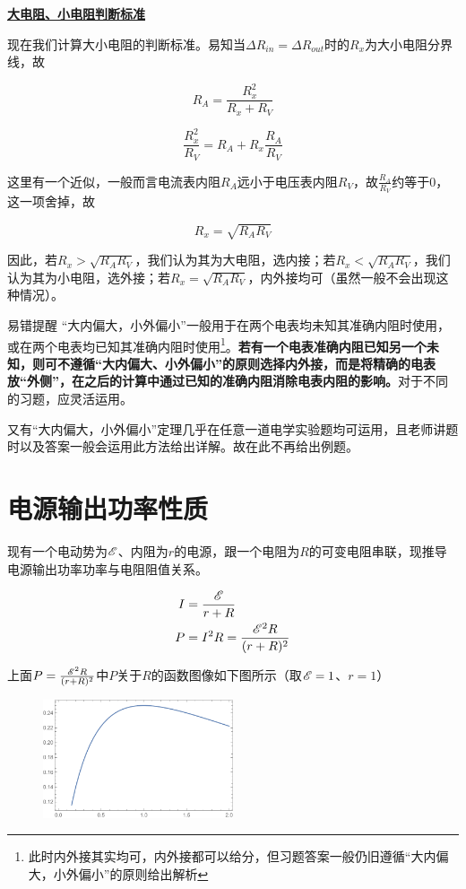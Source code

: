 \noindent \uline{\textbf{大电阻、小电阻判断标准}}

现在我们计算大小电阻的判断标准。易知当$\Delta R_{in} = \Delta R_{out}$时的$R_x$为大小电阻分界线，故

$$R_A = \frac{R_x^2}{R_x + R_V}$$

$$\frac{R_x^2}{R_V} = R_A + R_x \frac{R_A}{R_V}$$

这里有一个近似，一般而言电流表内阻$R_A$远小于电压表内阻$R_V$，故$\frac{R_A}{R_V}$约等于$0$，这一项舍掉，故

\begin{equation}
\boxed{R_x = \sqrt{R_A R_V}}
\end{equation}

因此，若$R_x > \sqrt{R_A R_V}$，我们认为其为大电阻，选内接；若$R_x < \sqrt{R_A R_V}$，我们认为其为小电阻，选外接；若$R_x = \sqrt{R_A R_V}$，内外接均可（虽然一般不会出现这种情况）。

\begin{mk}{易错提醒}{}
“大内偏大，小外偏小”一般用于在两个电表均未知其准确内阻时使用，或在两个电表均已知其准确内阻时使用\footnote{此时内外接其实均可，内外接都可以给分，但习题答案一般仍旧遵循“大内偏大，小外偏小”的原则给出解析}。\textbf{若有一个电表准确内阻已知另一个未知，则可不遵循“大内偏大、小外偏小”的原则选择内外接，而是将精确的电表放“外侧”，在之后的计算中通过已知的准确内阻消除电表内阻的影响。}对于不同的习题，应灵活运用。
\end{mk}

又有“大内偏大，小外偏小”定理几乎在任意一道电学实验题均可运用，且老师讲题时以及答案一般会运用此方法给出详解。故在此不再给出例题。

\section{电源输出功率性质}
\label{s_wdlzdgl}

现有一个电动势为$\mathscr{E}$、内阻为$r$的电源，跟一个电阻为$R$的可变电阻串联，现推导电源输出功率功率与电阻阻值关系。

\begin{subequations}
\begin{align*}
I &= \frac{\mathscr{E}}{r + R} \\
P &= I^2 R = \frac{\mathscr{E}^2 R}{(r + R)^2}
\end{align*}
\end{subequations}

上面$P = \frac{\mathscr{E}^2 R}{(r + R)^2}$中$P$关于$R$的函数图像如下图所示（取$\mathscr{E} = 1$、$r = 1$）

\begin{figure}[htbp]
\centering
\includegraphics[width=0.5\textwidth]{pic_eled/zdgl_p1.pdf}
\end{figure}

